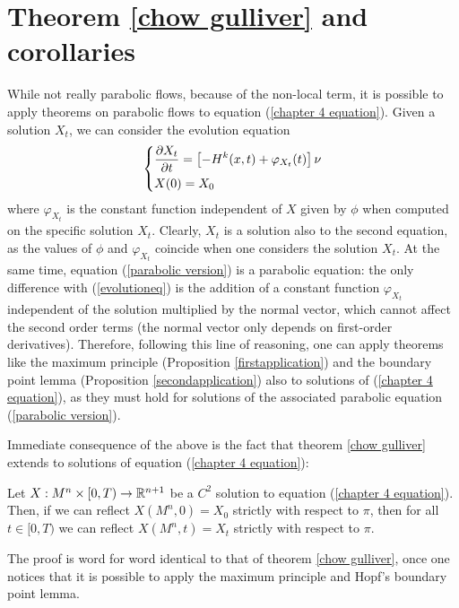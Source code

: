 \section{Theorem \ref{chow gulliver} and corollaries}
While not really parabolic flows, because of the non-local term, it is possible to apply theorems on parabolic flows to equation (\ref{chapter 4 equation}). Given a solution $X_t$, we can consider the evolution equation 
\begin{align}
	\begin{dcases}
		\frac{\partial X_t}{\partial t} = \left[- H^k(x, t) + \varphi_{X_t}(t)\right] \nu\\
		X(0)= X_0
	\end{dcases} \label{parabolic version}
\end{align}
where $\varphi_{X_t}$ is the constant function independent of $X$ given by $\phi$ when computed on the specific solution $X_t$. 
Clearly, $X_t$ is a solution also to the second equation, as the values of  $\phi$ and $\varphi_{X_t}$ coincide when one considers the solution $X_t$. At the same time, equation (\ref{parabolic version}) is a parabolic equation: the only difference with (\ref{evolutioneq}) is the addition of a constant function $\varphi_{X_t}$ independent of the solution multiplied by the normal vector, which cannot affect the second order terms (the normal vector only depends on first-order derivatives). Therefore, following this line of reasoning, one can apply theorems like the maximum principle (Proposition \ref{firstapplication}) and the boundary point lemma (Proposition \ref{secondapplication}) also to solutions of (\ref{chapter 4 equation}), as they must hold for solutions of the associated parabolic equation (\ref{parabolic version}). %

Immediate consequence of the above is the fact that theorem \ref{chow gulliver} extends to solutions of equation (\ref{chapter 4 equation}):

\begin{theorem}
	Let $X:M^n\times [0,T) \rightarrow \mathbb{R}^{n+1}$ be a $C^2$ solution to equation (\ref{chapter 4 equation}). Then, if we can reflect $X(M^n, 0)=X_0$ strictly with respect to $\pi$, then for all $t\in [0,T)$ we can reflect $X(M^n, t)=X_t$ strictly with respect to $\pi$. \label{chow gulliver chapter 4}
\end{theorem}

The proof is word for word identical to that of theorem \ref{chow gulliver}, once one notices that it is possible to apply the maximum principle and Hopf's boundary point lemma. 

